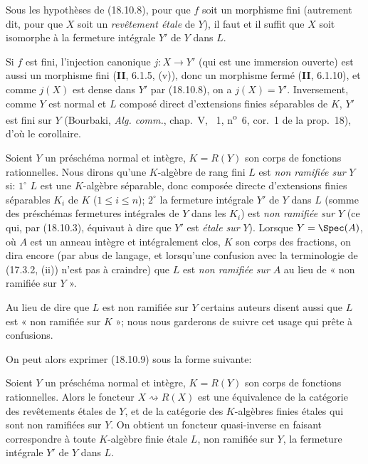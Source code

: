 \begin{corollary}[18.10.9]
\label{IV.18.10.9}
Sous les hypothèses de \textup{(18.10.8)}, pour que $f$ soit un morphisme fini \textup{(autrement dit, pour que $X$ soit un \emph{revêtement étale} de $Y$)}, il faut et il suffit que $X$ soit isomorphe à la fermeture intégrale $Y'$ de $Y$ dans $L$.
\end{corollary}

Si $f$ est fini, l'injection canonique $j:X\to Y'$ (qui est une immersion ouverte) est aussi un morphisme fini (\textbf{II}, 6.1.5, (v)), donc un morphisme fermé (\textbf{II}, 6.1.10), et comme $j(X)$ est dense dans $Y'$ par (18.10.8), on a $j(X)=Y'$. Inversement, comme $Y$ est normal et $L$ composé direct d'extensions finies séparables de $K$, $Y'$ est fini sur $Y$ (Bourbaki, \emph{Alg. comm.}, chap.~V, \textsection~1, n\textsuperscript{o}~6, cor.~1 de la prop.~18), d'où le corollaire.

\begin{env}[18.10.10]
\label{IV.18.10.10}
Soient $Y$ un préschéma normal et intègre, $K=R(Y)$ son corps de fonctions rationnelles. Nous dirons qu'une $K$-algèbre de rang fini $L$ est \emph{non ramifiée sur} $Y$ si: $1^\circ$ $L$ est une $K$-algèbre séparable, donc composée directe d'extensions finies séparables $K_i$ de $K$ ($1\leq i\leq n$); $2^\circ$ la fermeture intégrale $Y'$ de $Y$ dans $L$ (somme des préschémas fermetures intégrales de $Y$ dans les $K_i$) est \emph{non ramifiée sur} $Y$ (ce qui, par (18.10.3),
équivaut à dire que $Y'$ est \emph{étale sur} $Y$). Lorsque $Y=\Spec(A)$, où $A$ est un anneau intègre et intégralement clos, $K$ son corps des fractions, on dira encore (par abus de langage, et lorsqu'une confusion avec la terminologie de (17.3.2, (ii)) n'est pas à craindre) que $L$ est \emph{non ramifiée sur} $A$ au lieu de « non ramifiée sur $Y$ ».
\end{env}

\begin{remark}[18.10.11]
Au lieu de dire que $L$ est non ramifiée sur $Y$ certains auteurs disent aussi que $L$ est « non ramifiée sur $K$ »; nous nous garderons de suivre cet usage qui prête à confusions.
\end{remark}

On peut alors exprimer (18.10.9) sous la forme suivante:

\begin{corollary}[18.10.12]
\label{IV.18.10.12}
Soient $Y$ un préschéma normal et intègre, $K=R(Y)$ son corps de fonctions rationnelles. Alors le foncteur $X\rightsquigarrow R(X)$ est une équivalence de la catégorie des revêtements étales de $Y$, et de la catégorie des $K$-algèbres finies étales qui sont \textup{non ramifiées} sur $Y$. On obtient un foncteur quasi-inverse en faisant correspondre à toute $K$-algèbre finie étale $L$, non ramifiée sur $Y$, la fermeture intégrale $Y'$ de $Y$ dans $L$.
\end{corollary}

